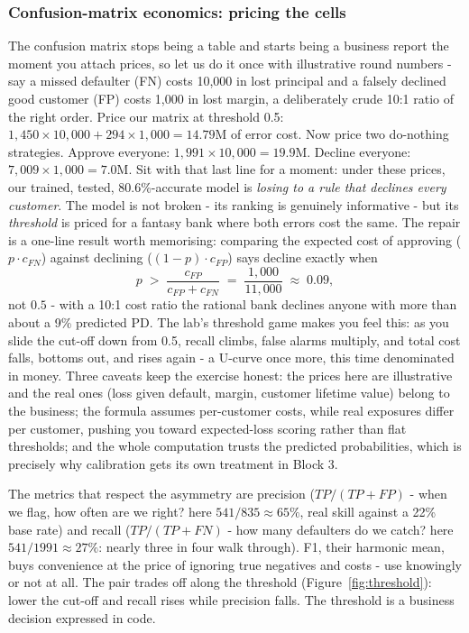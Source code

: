 \documentclass[11pt,a4paper]{article}
\begin{document}
\subsubsection{Confusion-matrix economics: pricing the cells}
The confusion matrix stops being a table and starts being a business
report the moment you attach prices, so let us do it once with
illustrative round numbers - say a missed defaulter (FN) costs
10{,}000 in lost principal and a falsely declined good customer (FP)
costs 1{,}000 in lost margin, a deliberately crude 10:1 ratio of the
right order. Price our matrix at threshold 0.5: $1{,}450 \times 10{,}000
+ 294 \times 1{,}000 = 14.79$M of error cost. Now price two do-nothing
strategies. Approve everyone: $1{,}991 \times 10{,}000 = 19.9$M. Decline
everyone: $7{,}009 \times 1{,}000 = 7.0$M. Sit with that last line for a
moment: under these prices, our trained, tested, 80.6\%-accurate model
is \emph{losing to a rule that declines every customer}. The model is
not broken - its ranking is genuinely informative - but its
\emph{threshold} is priced for a fantasy bank where both errors cost the
same. The repair is a one-line result worth memorising: comparing the
expected cost of approving ($p \cdot c_{FN}$) against declining
($(1-p) \cdot c_{FP}$) says decline exactly when
\[
  p \;>\; \frac{c_{FP}}{c_{FP} + c_{FN}}
  \;=\; \frac{1{,}000}{11{,}000} \;\approx\; 0.09 ,
\]
not $0.5$ - with a 10:1 cost ratio the rational bank declines anyone
with more than about a 9\% predicted PD. The lab's threshold game makes
you feel this: as you slide the cut-off down from 0.5, recall climbs,
false alarms multiply, and total cost falls, bottoms out, and rises
again - a U-curve once more, this time denominated in money. Three
caveats keep the exercise honest: the prices here are illustrative and
the real ones (loss given default, margin, customer lifetime value)
belong to the business; the formula assumes per-customer costs, while
real exposures differ per customer, pushing you toward expected-loss
scoring rather than flat thresholds; and the whole computation trusts
the predicted probabilities, which is precisely why calibration gets
its own treatment in Block 3.

The metrics that respect the asymmetry are precision
($TP/(TP+FP)$ - when we flag, how often are we right? here
$541/835 \approx 65\%$, real skill against a 22\% base rate) and recall
($TP/(TP+FN)$ - how many defaulters do we catch? here
$541/1991 \approx 27\%$: nearly three in four walk through). F1, their harmonic mean,
buys convenience at the price of ignoring true negatives and costs -
use knowingly or not at all. The pair trades off along the threshold
(Figure~\ref{fig:threshold}): lower the cut-off and recall rises while
precision falls. The threshold is a business decision expressed in code.
\end{document}
